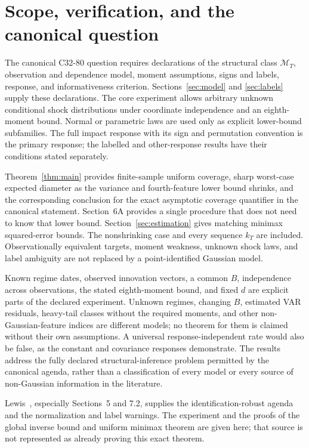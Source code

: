 \documentclass[11pt,a4paper]{article}
\numberwithin{equation}{section}
\newcommand{\cM}{\mathcal M}
\begin{document}
\section{Scope, verification, and the canonical question}\label{sec:scope}
The canonical C32-80 question requires declarations of the structural
class \(\cM_T\), observation and dependence model, moment assumptions,
signs and labels, response, and informativeness criterion.
Sections~\ref{sec:model} and \ref{sec:labels} supply these declarations.
The core experiment allows arbitrary unknown conditional shock
distributions under coordinate independence and an eighth-moment bound.
Normal or parametric laws are used only as explicit lower-bound
subfamilies. The full impact response with its sign and permutation
convention is the primary response; the labelled and other-response
results have their conditions stated separately.

Theorem~\ref{thm:main} provides finite-sample uniform coverage, sharp
worst-case expected diameter as the variance and fourth-feature lower
bound shrinks, and the corresponding conclusion for the exact
asymptotic coverage quantifier in the canonical statement.
Section~6A provides a single procedure that does not need to know that
lower bound. Section~\ref{sec:estimation} gives matching minimax
squared-error bounds. The nonshrinking case and every sequence \(k_T\)
are included. Observationally equivalent targets, moment weakness,
unknown shock laws, and label ambiguity are not replaced by a
point-identified Gaussian model.

Known regime dates, observed innovation vectors, a common \(B\),
independence across observations, the stated eighth-moment bound, and
fixed \(d\) are explicit parts of the declared experiment.
Unknown regimes, changing \(B\), estimated VAR residuals, heavy-tail
classes without the required moments, and other non-Gaussian-feature
indices are different models; no theorem for them is claimed without
their own assumptions. A universal response-independent rate would
also be false, as the constant and covariance responses demonstrate.
The results address the fully declared structural-inference problem
permitted by the canonical agenda, rather than a classification of
every model or every source of non-Gaussian information in the literature.

Lewis~\cite{Lewis2025}, especially Sections~5 and 7.2, supplies the
identification-robust agenda and the normalization and label warnings.
The experiment and the proofs of the global inverse bound and uniform
minimax theorem are given here; that source is not represented as
already proving this exact theorem.
\end{document}
